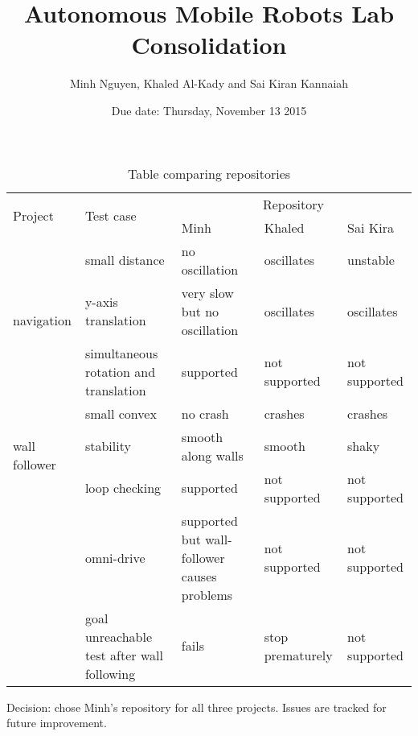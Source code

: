 \documentclass[a4paper, 12pt]{article}
\title{Autonomous Mobile Robots Lab\\
Consolidation}
\author{Minh Nguyen, Khaled Al-Kady and Sai Kiran Kannaiah}
\date{Due date: Thursday, November 13 2015}
\begin{document}
\maketitle

\begin{table}[h!]%
    \begin{center}
    \begin{tabular}{|p{2cm}|p{2.5cm}|p{3cm}|p{3cm}|p{3cm}|}
    \hline
    \multirow{2}{*}{Project} & \multirow{2}{*}{Test case} & \multicolumn{3}{|c|}{Repository}\\\cline{3-5}
                             &                            & Minh & Khaled & Sai Kira        \\
    \hline
    \multirow{3}{*}{\parbox{1.5cm}{navigation}}
                             & small distance    & no oscillation   & oscillates    & unstable \\\cline{2-5}
                             & y-axis translation& very slow but no
                                                   oscillation      & oscillates    & oscillates \\\cline{2-5}
                             & simultaneous
                               rotation and
                               translation       & supported        & not supported & not supported \\\cline{2-5}
    \hline
    \multirow{3}{*}{\parbox{1.5cm}{wall follower}}
                             & small convex      & no crash         & crashes       & crashes \\\cline{2-5}
                             & stability         & smooth along
                                                   walls            & smooth        & shaky \\\cline{2-5}
    \hline
    \multirow{3}{*}{\parbox{1.5cm}{bug 2}}
                             & loop checking     & supported        & not supported & not supported \\\cline{2-5}
                             & omni-drive        & supported but
                                                   wall-follower
                                                   causes problems  & not supported & not supported \\\cline{2-5}
                             & goal unreachable
                               test after wall
                               following         & fails            & stop
                                                                      prematurely   & not supported \\\cline{2-5}
    \hline
    \end{tabular}
    \end{center}
    \caption{Table comparing repositories}%
    \label{Table comparing repositories}%
\end{table}

Decision: chose Minh's repository for all three projects. Issues are tracked for future improvement.
\end{document}
